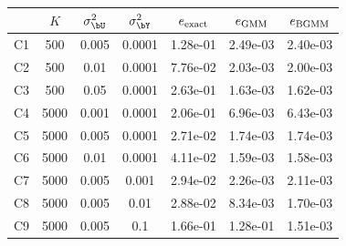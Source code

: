 \begin{center}
\small
\begin{tabular}{>{\small}c|ccc|ccc}
\hline
 & $K$ & $\sigma^2_{\bU}$ & $\sigma^2_{\bY}$ & $e_{\rm exact}$ & $e_{\rm GMM}$ & $e_{\rm BGMM}$\\
\hline
C1 & 500 & 0.005 & 0.0001 & 1.28e-01 & 2.49e-03 & 2.40e-03 \\
C2 & 500 & 0.01 & 0.0001 & 7.76e-02 & 2.03e-03 & 2.00e-03 \\
C3 & 500 & 0.05 & 0.0001 & 2.63e-01 & 1.63e-03 & 1.62e-03 \\
\hline
C4 & 5000 & 0.001 & 0.0001 & 2.06e-01 & 6.96e-03 & 6.43e-03 \\
C5 & 5000 & 0.005 & 0.0001 & 2.71e-02 & 1.74e-03 & 1.74e-03 \\
C6 & 5000 & 0.01 & 0.0001 & 4.11e-02 & 1.59e-03 & 1.58e-03 \\
\hline
C7 & 5000 & 0.005 & 0.001 & 2.94e-02 & 2.26e-03 & 2.11e-03 \\
C8 & 5000 & 0.005 & 0.01 & 2.88e-02 & 8.34e-03 & 1.70e-03 \\
C9 & 5000 & 0.005 & 0.1 & 1.66e-01 & 1.28e-01 & 1.51e-03 \\
\hline
\end{tabular}
\end{center}
